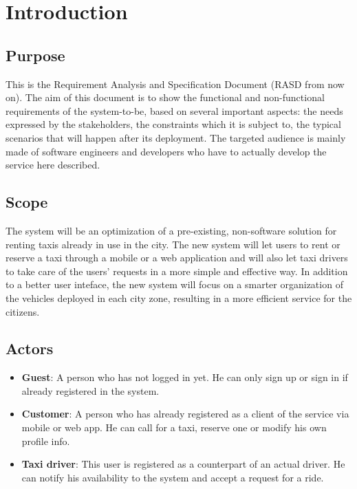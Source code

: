 \section{Introduction}

\subsection{Purpose}
This is the Requirement Analysis and Specification Document (RASD from now on). The aim of this document is to show the functional and non-functional requirements of the system-to-be, based on several important aspects: the needs expressed by the stakeholders, the constraints which it is subject to, the typical scenarios that will happen after its deployment. The targeted audience is mainly made of software engineers and developers who have to actually develop the service here described.

\subsection{Scope}
The system will be an optimization of a pre-existing, non-software solution for renting taxis already in use in the city. The new system will let users to rent or reserve a taxi through a mobile or a web application and will also let taxi drivers to take care of the users' requests in a more simple and effective way. In addition to a better user inteface, the new system will focus on a smarter organization of the vehicles deployed in each city zone, resulting in a more efficient service for the citizens.

\subsection{Actors}
\begin{itemize}
	\item \textbf{Guest}: A person who has not logged in yet. He can only sign up or sign in if already registered in the system.
	\item \textbf{Customer}: A person who has already registered as a client of the service via mobile or web app. He can call for a taxi, reserve one or modify his own profile info.
	\item \textbf{Taxi driver}: This user is registered as a counterpart of an actual driver. He can notify his availability to the system and accept a request for a ride.
\end{itemize}


